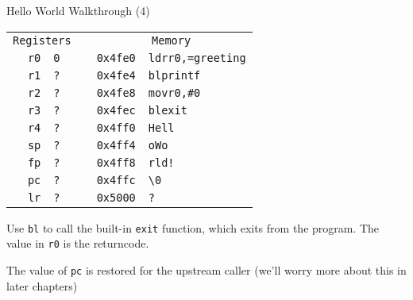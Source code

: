 \begin{frame}{Hello World Walkthrough (4)}
	\begin{alltt}
		\begin{tabular}{ r | l p{5mm} r | l }
			\multicolumn{2}{c}{Registers} &   & \multicolumn{2}{c}{Memory}                              \\
			r0                            & 0 &                            & 0x4fe0 & ldr r0, =greeting \\
			r1                            & ? &                            & 0x4fe4 & bl printf         \\
			r2                            & ? &                            & 0x4fe8 & mov r0, \#0       \\
			r3                            & ? &                            & 0x4fec & bl exit           \\
			r4                            & ? &                            & 0x4ff0 & Hell              \\
			sp                            & ? &                            & 0x4ff4 & o Wo              \\
			fp                            & ? &                            & 0x4ff8 & rld!              \\
			pc                            & ? &                            & 0x4ffc & {\textbackslash}0 \\
			lr                            & ? &                            & 0x5000 & ?                 \\
		\end{tabular}
	\end{alltt}

	Use \texttt{bl} to call the built-in \texttt{exit} function, which exits from the program. The value in \texttt{r0} is the returncode.

	The value of \texttt{pc} is restored for the upstream caller (we'll worry more about this in later chapters)

\end{frame}





